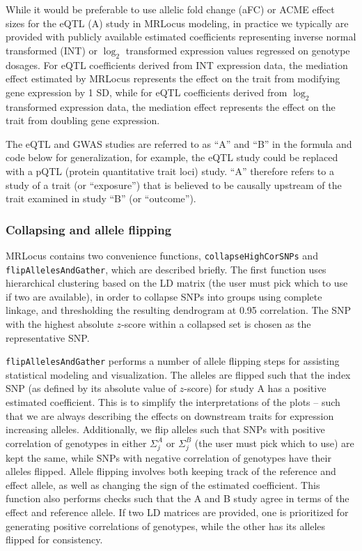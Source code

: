 \documentclass[11pt]{article}
\begin{document}
While it would be preferable to use allelic fold change (aFC)
\citep{aFC} or ACME effect sizes \citep{ACME} for the eQTL (A) study
in MRLocus modeling, in practice we typically are provided with
publicly available estimated coefficients representing inverse normal
transformed (INT) or $\log_2$ transformed expression values regressed
on genotype dosages. For eQTL coefficients derived from INT expression
data, the mediation effect estimated by MRLocus represents the effect
on the trait from modifying gene expression by 1 SD, while for eQTL
coefficients derived from $\log_2$ transformed expression data, the
mediation effect represents the effect on the trait from doubling gene
expression.

The eQTL and GWAS studies are referred to as ``A'' and ``B'' in the
formula and code below for generalization, for example, the eQTL study
could be replaced with a pQTL (protein quantitative trait loci)
study. ``A'' therefore refers to a study of a trait (or ``exposure'')
that is believed to be causally upstream of the trait examined in
study ``B'' (or ``outcome'').

\subsubsection{Collapsing and allele flipping}

MRLocus contains two convenience functions,
\texttt{collapseHighCorSNPs} and \texttt{flipAllelesAndGather}, which
are described briefly. The first function uses hierarchical clustering
based on the LD matrix (the user must pick which to use if two are
available), in order to collapse SNPs into groups using complete
linkage, and thresholding the resulting dendrogram at 0.95
correlation. The SNP with the highest absolute $z$-score within a
collapsed set is chosen as the representative SNP.

\texttt{flipAllelesAndGather} performs a number of allele flipping
steps for assisting statistical modeling and visualization. The
alleles are flipped such that the index SNP (as defined by its
absolute value of $z$-score) for study A has a positive estimated
coefficient. This is to simplify the interpretations of the plots --
such that we are always describing the effects on downstream traits
for expression increasing alleles. Additionally, we flip alleles such
that SNPs with positive correlation of genotypes in either
$\Sigma_j^A$ or $\Sigma_j^B$ (the user must pick which to use) are
kept the same, while SNPs with negative correlation of genotypes have
their alleles flipped. Allele flipping involves both keeping track of
the reference and effect allele, as well as changing the sign of the
estimated coefficient. This function also performs checks such that
the A and B study agree in terms of the effect and reference allele.
If two LD matrices are provided, one is prioritized for generating
positive correlations of genotypes, while the other has its alleles
flipped for consistency.
\end{document}
